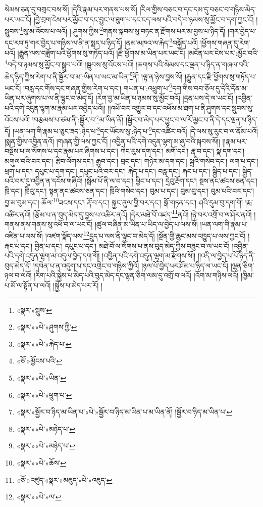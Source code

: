 སེམས་ཅན་དུ་བགྲང་བས་སོ། །དེའི་རྣམ་པར་གནས་པས་སོ། །རིལ་གྱིས་བཅང་བ་དང་དམ་དུ་བཅང་བ་གཉིས་མེད་པར་ཡང་ངོ། །བྱེ་བྲག་ངེས་པར་མྱོང་བ་དང་བྱུང་ལ་ཐུག་པ་དང་ངད་ལས་པའི་བདེ་བ་ཉམས་སུ་མྱོང་བ་དག་ཀྱང་ངོ། །སྦུབས་\footnote{«སྣར་»སྦུས་}སུ་མ་འོངས་པ་ལའོ། །:ཤུགས་ཀྱིས་\footnote{«སྣར་»«པེ་»ཤུགས་ཀྱི་}གནས་སྐབས་སུ་བཏང་ན་རྫོགས་པར་མ་བྱས་པ་ཉིད་དོ། །གར་བྱེད་པ་དང་རབ་ཏུ་གར་བྱེད་པ་གཉིས་ལ་ནི་ན་སྨད་པ་ཉིད་དོ། །ནམ་མཁའ་ལ་རྐེད་\footnote{«སྣར་»«པེ་»རྐེད་པ་}བསྐྱོད་པའོ། །ཕྱོགས་གཞན་དུ་རེག་པའོ། །རྒྱུན་ལས་བཟློག་པའི་ཕྱོགས་སུ་གཏོད་པའོ། །རྫི་ཕྱོགས་མ་ཡིན་པར་ཡང་ངོ། །མངོན་པར་ངེས་པར་:མྱོང་བའི་\footnote{«ཅོ་»མྱོངས་པའི་}བདེ་བ་ཉམས་སུ་མྱོང་བ་སྒྲུབ་པའོ། །སྦུབས་སུ་འོངས་པའོ། །ཆགས་པའི་སེམས་དང་ལྡན་པ་ཉིད་ན་གཞལ་བའི་ཆེད་ཉིད་ཀྱིས་རེག་པ་ནི་སྦྱོར་བ་མ་:ཡིན་པ་ཡང་མ་ཡིན་\footnote{«སྣར་»«པེ་»ཡིན་}ནོ། །ལྟ་ན་ཉེས་བྱས་སོ། །རྒྱུན་དང་རྫི་ཕྱོགས་སུ་གཏོད་པ་ཡང་ངོ། །བརླ་དང་གོས་དང་གཞན་གྱིས་རེག་པ་དང་། གཡན་པ་:འཕྲུག་པ་\footnote{«སྣར་»«པེ་»ཕྲུག་པ་}དག་གིས་བབ་ཅོལ་དུ་དེའི་དོན་མ་ཡིན་པར་ཞུགས་པ་ལ་ནི་ལྟུང་བ་མེད་དོ། །རེག་བྱ་མ་ཡིན་པ་ཉམས་སུ་མྱོང་བའོ། །དྲན་པས་དེ་ལ་ཡང་ངོ། །འབྱིན་པའི་དགེ་འདུན་ལྷག་མ་རྣམ་པར་འབྱེད་པའོ།། །།འཕོ་བར་འགྱུར་བ་དང་འཕོས་མ་ཐག་པ་ནི་ཤུགས་དང་སྦུབས་སུ་འོངས་པའོ། །བརྩམས་པ་ཙམ་ནི་:སྦྱོར་བ་\footnote{«སྣར་»སྦྱོར་བ་ཉིད་མ་ཡིན་པ་«པེ་»སྦྱོར་བ་ཉིད་མ་ཡིན་པ་མ་ཡིན་ནོ། །སྦྱོར་བ་ཉིད་མ་ཡིན་པ་}མ་ཡིན་ནོ། །སྦྱོར་བ་མེད་པར་ཕྱུང་བ་ལ་རོ་མྱང་བ་ནི་དེ་དང་ལྡན་པ་ཉིད་དོ། །ཡན་ལག་གི་རྣམ་པ་ཅུང་ཟད་:ཉེད་པ་\footnote{«སྣར་»«པེ་»མཉེད་པ་}དང་ཡོངས་སུ་:ཉེད་པ་\footnote{«སྣར་»«པེ་»མཉེད་པ་}དང་འཚིར་བའོ། །དེ་ལས་སུ་རུང་བ་ལ་ནོམ་པའོ། །སྨན་གྱིས་འབྱིན་ནའོ། །གཞན་གྱི་ལས་ཀྱང་ངོ། །འབྱིན་པའི་དགེ་འདུན་ལྷག་མ་ཞུ་བའི་སྐབས་སོ།། །།རྣམ་པར་བསྔོས་པ་ལ་སོགས་པ་དང་རྣམ་པར་ཞིགས་པ་དང་། ཀེང་རུས་དག་དང་། མགོ་དང་། རྣ་བ་དང་། སྣ་དག་དང་། མགུལ་བའི་བར་དང་། རྩིབ་ལོགས་དང་། རྒྱབ་དང་། བྲང་དང་། གཉེར་མ་དག་དང་། སྐྲའི་གསེབ་དང་། ལག་པ་དང་། ཕྲག་པ་དང་། དཔུང་པ་དག་དང་། དཔུང་པའི་བར་དང་། རྐེད་པ་དང་། བརླ་དང་། རྐང་པ་དང་། སྒྱིད་པ་དང་། སྒྱིད་པའི་བར་དུ་འབྱིན་ན་དངོས་གཞིའོ། །སྦོམ་པོ་ནི་ལ་བ་དང་། ཕྱིང་པ་དང་། དྲེའུ་རྔོག་དང་། སྔས་ནང་ཚངས་ཅན་དང་། ཁྲི་དང་། ཁྲིའུ་དང་། སྟན་ནང་ཚངས་ཅན་དང་། ཁྲིའི་གསེབ་དང་། བུམ་པ་དང་། བུམ་བུ་དང་། བུམ་པའི་བར་དང་། བྱ་མ་བུམ་དང་། ཆོལ་\footnote{«སྣར་»«པེ་»ཆོས་}ཟངས་དང་། རྡོ་བ་དང་། སྐྱང་ནུལ་གྱི་བར་དང་། སྒོ་གཏན་དང་། ཤའི་དུམ་བུ་དག་གོ། །རྨ་འཚིར་ནའོ། །རྩོམ་པ་ན་བུད་མེད་དུ་བྱས་པ་འཚིར་ནའོ། །དེར་མཐེ་བོ་འཛད་\footnote{«ཅོ་»འཛུད་«སྣར་»མཇུད་«པེ་»འཇུད་}ནའོ། །ཉེ་བར་འགྲོ་བ་ལ་ཤོར་ནའོ། །གནས་ནས་གནས་སུ་འཕོ་བ་ལ་ཡང་ངོ། །ཚུལ་བཞིན་མ་ཡིན་པ་ཡིད་ལ་བྱེད་པ་ལས་སོ། །ཡན་ལག་གི་རྣམ་པ་འཛིན་པ་ལས་སོ། །འཛག་སྣོད་ལས་\footnote{«སྣར་»«པེ་»ལ་}དྲུད་པ་ལས་ནི་ལྟུང་བ་མེད་དོ། །སྔོན་གྱི་ཆུང་མས་འཁྱུད་པ་ལས་ཀྱང་ངོ། །རྐང་པ་དང་། བྱིན་པ་དང་། དཔུང་པ་དང་། མཐེ་བོ་ལ་སོགས་པ་ནས་བུད་མེད་ཀྱིས་བཟུང་བ་ལ་ཡང་ངོ། །འབྱིན་པའི་དགེ་འདུན་ལྷག་མ་འདུལ་བྱེད་དག་གོ། །འབྱིན་པའི་དགེ་འདུན་ལྷག་མ་རྫོགས་སོ།། །།འདི་ལ་བྱེད་པ་པོ་ཉིད་ནི་བུད་མེད་དོ། །དབེན་པ་ན་འདུག་པ་དང་འགྲེང་བ་གཉིས་ཀྱིའོ། །ཉལ་པོ་བྱེད་པར་ཤོམ་པ་ཉིད་ལ་ཡང་ངོ། །ལྷན་ཅིག་ཉལ་བ་ལའོ། །རིག་པའི་སྐྱེས་པ་མེད་པའི་བུད་མེད་དང་ལྷན་ཅིག་ལམ་དུ་འགྲོ་བ་ལའོ། །འོག་མ་གཉིས་ལའོ། །ཁྱིམ་པ་མོ་ལ་སྟོན་པ་ལའོ། །སྐྱེས་པ་མེད་པར་རོ། །
